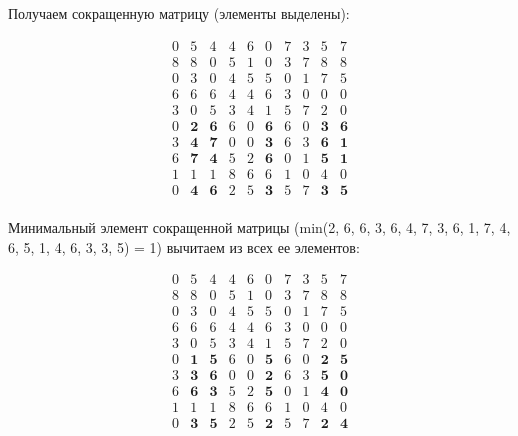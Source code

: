 \documentclass[17pt]{extarticle}
\begin{document}
Получаем сокращенную матрицу (элементы выделены):

\[
    \begin{array}{*{10}{c}}
        0 & 5          & 4          & 4 & 6 & 0          & 7 & 3 & 5          & 7          \\
        8 & 8          & 0          & 5 & 1 & 0          & 3 & 7 & 8          & 8          \\
        0 & 3          & 0          & 4 & 5 & 5          & 0 & 1 & 7          & 5          \\
        6 & 6          & 6          & 4 & 4 & 6          & 3 & 0 & 0          & 0          \\
        3 & 0          & 5          & 3 & 4 & 1          & 5 & 7 & 2          & 0          \\
        0 & \textbf{2} & \textbf{6} & 6 & 0 & \textbf{6} & 6 & 0 & \textbf{3} & \textbf{6} \\
        3 & \textbf{4} & \textbf{7} & 0 & 0 & \textbf{3} & 6 & 3 & \textbf{6} & \textbf{1} \\
        6 & \textbf{7} & \textbf{4} & 5 & 2 & \textbf{6} & 0 & 1 & \textbf{5} & \textbf{1} \\
        1 & 1          & 1          & 8 & 6 & 6          & 1 & 0 & 4          & 0          \\
        0 & \textbf{4} & \textbf{6} & 2 & 5 & \textbf{3} & 5 & 7 & \textbf{3} & \textbf{5} \\
    \end{array}
\]

Минимальный элемент сокращенной матрицы (min(2, 6, 6, 3, 6, 4, 7, 3, 6, 1, 7, 4, 6, 5, 1, 4, 6, 3, 3, 5) = 1) вычитаем из всех ее элементов:

\[
    \begin{array}{*{10}{c}}
        0 & 5          & 4          & 4 & 6 & 0          & 7 & 3 & 5          & 7          \\
        8 & 8          & 0          & 5 & 1 & 0          & 3 & 7 & 8          & 8          \\
        0 & 3          & 0          & 4 & 5 & 5          & 0 & 1 & 7          & 5          \\
        6 & 6          & 6          & 4 & 4 & 6          & 3 & 0 & 0          & 0          \\
        3 & 0          & 5          & 3 & 4 & 1          & 5 & 7 & 2          & 0          \\
        0 & \textbf{1} & \textbf{5} & 6 & 0 & \textbf{5} & 6 & 0 & \textbf{2} & \textbf{5} \\
        3 & \textbf{3} & \textbf{6} & 0 & 0 & \textbf{2} & 6 & 3 & \textbf{5} & \textbf{0} \\
        6 & \textbf{6} & \textbf{3} & 5 & 2 & \textbf{5} & 0 & 1 & \textbf{4} & \textbf{0} \\
        1 & 1          & 1          & 8 & 6 & 6          & 1 & 0 & 4          & 0          \\
        0 & \textbf{3} & \textbf{5} & 2 & 5 & \textbf{2} & 5 & 7 & \textbf{2} & \textbf{4} \\
    \end{array}
\]
\end{document}
